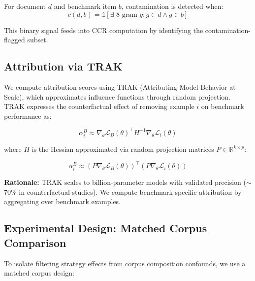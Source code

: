 For document $d$ and benchmark item $b$, contamination is detected when:
\begin{equation}
c(d, b) = \mathbb{1}[\exists \text{ 8-gram } g : g \in d \land g \in b]
\end{equation}

This binary signal feeds into CCR computation by identifying the contamination-flagged subset.

\subsection{Attribution via TRAK}

We compute attribution scores using TRAK (Attributing Model Behavior at Scale), which approximates influence functions through random projection. TRAK expresses the counterfactual effect of removing example $i$ on benchmark performance as:

\begin{equation}
\alpha_i^B \approx \nabla_\theta \mathcal{L}_B(\theta)^\top H^{-1} \nabla_\theta \mathcal{L}_i(\theta)
\end{equation}

where $H$ is the Hessian approximated via random projection matrices $P \in \mathbb{R}^{k \times p}$:

\begin{equation}
\alpha_i^B \approx (P \nabla_\theta \mathcal{L}_B(\theta))^\top (P \nabla_\theta \mathcal{L}_i(\theta))
\end{equation}

\textbf{Rationale:} TRAK scales to billion-parameter models with validated precision ($\sim$70\% in counterfactual studies). We compute benchmark-specific attribution by aggregating over benchmark examples.

\subsection{Experimental Design: Matched Corpus Comparison}

To isolate filtering strategy effects from corpus composition confounds, we use a matched corpus design:

